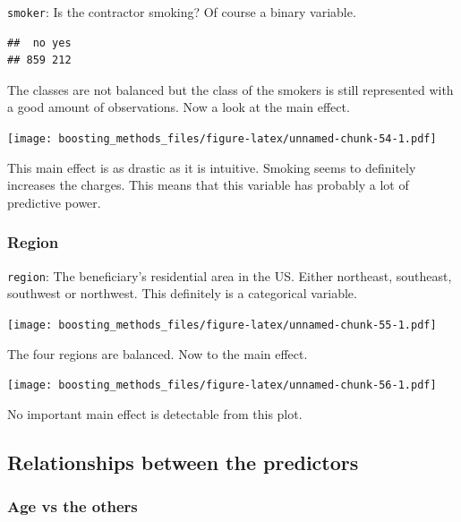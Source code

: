 \documentclass[
]{book}
\newenvironment{Shaded}{\begin{snugshade}}{\end{snugshade}}
\newcommand{\FunctionTok}[1]{\textcolor[rgb]{0.00,0.00,0.00}{#1}}
\newcommand{\NormalTok}[1]{#1}
\newcommand{\SpecialCharTok}[1]{\textcolor[rgb]{0.00,0.00,0.00}{#1}}
\begin{document}
\texttt{smoker}: Is the contractor smoking? Of course a binary variable.

\begin{Shaded}
\end{Shaded}

\begin{verbatim}
##  no yes 
## 859 212
\end{verbatim}

The classes are not balanced but the class of the smokers is still represented with a good amount of observations. Now a look at the main effect.

\texttt{[image: boosting\_methods\_files/figure-latex/unnamed-chunk-54-1.pdf]}

This main effect is as drastic as it is intuitive. Smoking seems to definitely increases the charges. This means that this variable has probably a lot of predictive power.

\hypertarget{region}{%
\subsubsection{Region}\label{region}}

\texttt{region}: The beneficiary's residential area in the US. Either northeast, southeast, southwest or northwest. This definitely is a categorical variable.

\texttt{[image: boosting\_methods\_files/figure-latex/unnamed-chunk-55-1.pdf]}

The four regions are balanced. Now to the main effect.

\texttt{[image: boosting\_methods\_files/figure-latex/unnamed-chunk-56-1.pdf]}

No important main effect is detectable from this plot.

\hypertarget{relationships-between-the-predictors-1}{%
\subsection{Relationships between the predictors}\label{relationships-between-the-predictors-1}}

\hypertarget{age-vs-the-others}{%
\subsubsection{Age vs the others}\label{age-vs-the-others}}
\end{document}
